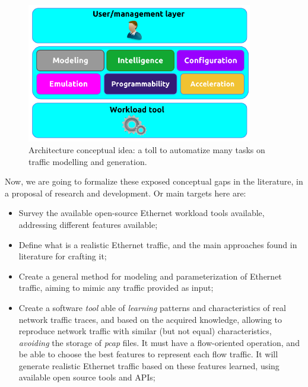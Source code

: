 \begin{figure}[ht!]
        \centering
        \includegraphics[height=2.4in]{figures/ch1/layer-diagram}
        \caption{ Architecture conceptual idea: a toll to automatize many tasks on traffic modelling and generation.}
    \label{fig:layer-diagram}
\end{figure}



Now, we are going to formalize these exposed conceptual gaps in the literature, in a proposal of research and development. Or main targets here are:

\begin{itemize}


\item Survey the available open-source Ethernet workload tools available, addressing different features available;


\item Define what is a realistic Ethernet traffic, and the main approaches found in literature for crafting it;


\item Create a general method for modeling and parameterization of Ethernet traffic, aiming to mimic any traffic provided as input;


\item Create a software \textit{tool} able of \textit{learning} patterns and characteristics of real network traffic traces, and based on the acquired knowledge, allowing to reproduce network traffic with similar (but not equal) characteristics, \textit{avoiding} the storage of \textit{pcap} files. It must have a flow-oriented operation, and be able to choose the best features to represent each flow traffic. It will generate realistic Ethernet traffic based on these features learned, using available open source tools and APIs;


\end{itemize}


